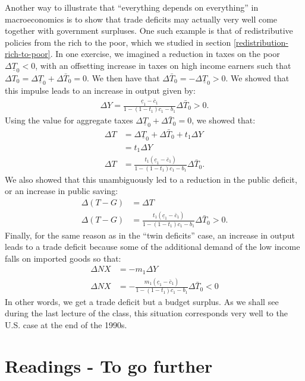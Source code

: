 \documentclass[]{book}
\theoremstyle{definition}
\theoremstyle{definition}
\theoremstyle{definition}
\theoremstyle{remark}
\begin{document}
Another way to illustrate that ``everything depends on everything'' in
macroeconomics is to show that trade deficits may actually very well
come together with government surpluses. One such example is that of
redistributive policies from the rich to the poor, which we studied in
section \ref{redistribution-rich-to-poor}. In one exercise, we imagined
a reduction in taxes on the poor \(\Delta\underline{T}_{0}<0\), with an
offsetting increase in taxes on high income earners such that
\(\Delta T_0 = \Delta\underline{T}_{0}+\Delta\bar{T}_{0}=0\). We then
have that \(\Delta\bar{T}_{0}=-\Delta\underline{T}_{0}>0\). We showed
that this impulse leads to an increase in output given by: \[
\begin{aligned}
\Delta Y=\frac{\underline{c}_{1}-\bar{c}_{1}}{1-\left(1-t_{1}\right)c_{1}-b_{1}}\Delta\bar{T}_{0}>0.
\end{aligned}
\] Using the value for aggregate taxes
\(\Delta\underline{T}_{0}+\Delta\bar{T}_{0}=0\), we showed that: \[
\begin{aligned}
\Delta T&=\Delta\underline{T}_{0}+\Delta\bar{T}_{0}+t_1\Delta Y\\
&=t_1 \Delta Y\\
\Delta T&=\frac{t_1\left(\underline{c}_{1}-\bar{c}_{1}\right)}{1-\left(1-t_{1}\right)c_{1}-b_{1}}\Delta\bar{T}_{0}.
\end{aligned}
\] We also showed that this unambiguously led to a reduction in the
public deficit, or an increase in public saving: \[
\begin{aligned}
\Delta\left(T-G\right)&=\Delta T \\
\Delta\left(T-G\right)&=\frac{t_1\left(\underline{c}_{1}-\bar{c}_{1}\right)}{1-\left(1-t_{1}\right)c_{1}-b_{1}}\Delta\bar{T}_{0}>0.
\end{aligned}
\] Finally, for the same reason as in the ``twin deficits'' case, an
increase in output leads to a trade deficit because some of the
additional demand of the low income falls on imported goods so that: \[
\begin{aligned}
\Delta NX &= -m_1\Delta Y\\
\Delta NX &=- \frac{m_1\left(\underline{c}_{1}-\bar{c}_{1}\right)}{1-\left(1-t_{1}\right)c_{1}-b_{1}}\Delta\bar{T}_{0}<0
\end{aligned}
\] In other words, we get a trade deficit but a budget surplus. As we
shall see during the last lecture of the class, this situation
corresponds very well to the U.S. case at the end of the 1990s.

\section*{Readings - To go further}\label{readings---to-go-further-10}
\end{document}
